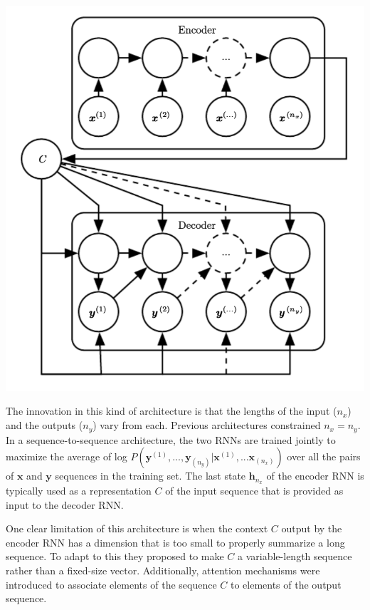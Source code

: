 \documentclass[12pt]{article}
\begin{document}
        \begin{center}
            \includegraphics[scale=0.65]{encoder-decoder}
        \end{center}

        The innovation in this kind of architecture is that the lengths of the input ($n_x$) and the outputs ($n_y$)
        vary from each. Previous architectures constrained $n_x = n_y$. In a sequence-to-sequence architecture, the two
        RNNs are trained jointly to maximize the average of log $P(\boldsymbol{y}^{(1)}, ..., \boldsymbol{y}_{(n_y)}|
        \boldsymbol{x}^{(1)}, ... \boldsymbol{x}_{(n_x)})$ over all the pairs of $\boldsymbol{x}$ and $\boldsymbol{y}$
        sequences in the training set. The last state $\boldsymbol{h}_{n_x}$ of the encoder RNN is typically used as a
        representation $C$ of the input sequence that is provided as input to the decoder RNN.

        One clear limitation of this architecture is when the context $C$ output by the encoder RNN has a dimension that
        is too small to properly summarize a long sequence. To adapt to this they proposed to make $C$ a
        variable-length sequence rather than a fixed-size vector. Additionally, attention mechanisms were introduced to
        associate elements of the sequence $C$ to elements of the output sequence. 
\end{document}
